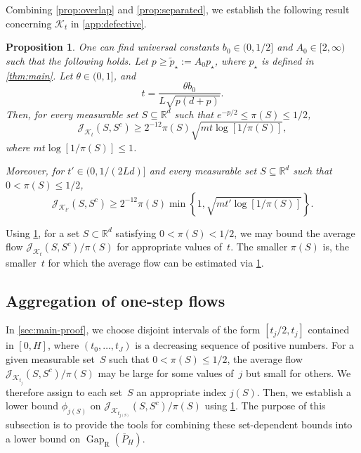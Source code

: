 \documentclass[11pt]{article}
\newtheorem{proposition}[proposition]{Proposition}
\newcommand{\R}{\mathbb R}
\newcommand{\Gap}{\operatorname{Gap}_{\mathrm{R}}}
\newcommand{\cK}{\mathcal K}
\newcommand{\1}{\mathbf 1}
\begin{document}
	
	Combining \cref{prop:overlap} and \cref{prop:separated}, we establish the following result concerning $\cK_t$ in
	\cref{app:defective}.
	
	\begin{proposition} \label{prop:flow}
		One can find universal constants $b_0 \in (0,1/2]$ and $A_0 \in [2,\infty)$ such that the following holds.
		Let \(p\geq \widetilde p_\star:=A_0p_\star\), where $p_\star$ is defined in \cref{thm:main}.
		Let
		\(\theta\in(0,1]\),  and
		\[
		t=\frac{\theta b_0}{L\sqrt{p(d+p)}}.
		\]
		Then, for every measurable set $S\subseteq\R^d$ such that
		$e^{-p/2}\leq\pi(S)\leq1/2$,
		\[
		\mathcal{J}_{\cK_t}(S,S^c) \geq 2^{-12}\pi(S)
		\sqrt{mt\log[1/\pi(S)]},
		\]
		where $mt\log[1/\pi(S)]\leq1$.
		
		Moreover, for $t'\in(0,1/(2Ld)]$ and every measurable set
		$S\subseteq\R^d$ such that $0<\pi(S)\leq1/2$,
		\[
		\mathcal{J}_{\cK_{t'}}(S,S^c) \geq 2^{-12}\pi(S)
		\min\left\{1,\sqrt{mt'\log[1/\pi(S)]}\right\}.
		\]
	\end{proposition}
	
	Using \cref{prop:flow}, for a set $S \subset \mathbb{R}^d$ satisfying $0 < \pi(S) < 1/2$, we may bound the average flow $\mathcal{J}_{\cK_t}(S,S^c)/\pi(S)$ for appropriate values of~$t$.
	The smaller $\pi(S)$ is, the smaller~$t$ for which the average flow can be estimated via \cref{prop:flow}.
	
	
	\subsection{Aggregation of one-step flows} \label{ssec:aggregation}
	
	
	In \cref{sec:main-proof}, we choose disjoint intervals of the form
	\([t_j/2,t_j]\) contained in $[0,H]$, where \((t_0,\ldots,t_J)\) is a decreasing sequence of
	positive numbers.  For a given measurable set~\(S\) such that $0 < \pi(S) \leq 1/2$, the average flow
	\(\mathcal{J}_{\cK_{t_j}}(S,S^c) / \pi(S) \) may be large for some values of~\(j\) but small
	for others.  We therefore assign to each set~\(S\) an appropriate index
	\(j(S)\).
	Then, we establish a lower bound $\phi_{j(S)}$ on
	\(\mathcal{J}_{\cK_{t_{j(S)}}}(S,S^c) / \pi(S)\) using \cref{prop:flow}.  The purpose of this subsection is to provide the tools for
	combining these set-dependent bounds into a lower bound on
	\(\Gap(\overline P_H)\).
	
\end{document}
